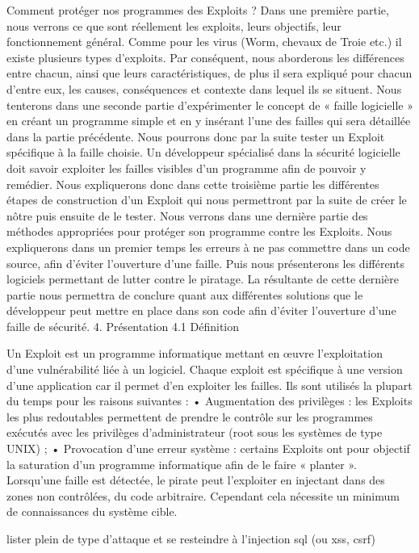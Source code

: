 \documentclass[a4paper,12pt]{report}
\begin{document}
\begin{onehalfspace}
Comment protéger nos programmes des Exploits ?
Dans une première partie, nous verrons ce que sont réellement les exploits, leurs objectifs, leur fonctionnement général. Comme pour les virus (Worm, chevaux de Troie etc.) il existe plusieurs types d’exploits. Par conséquent, nous aborderons les différences entre chacun, ainsi que leurs caractéristiques, de plus il sera expliqué pour chacun d’entre eux, les causes, conséquences et contexte dans lequel ils se situent.
Nous tenterons dans une seconde partie d’expérimenter le concept de « faille logicielle » en créant un programme simple et en y insérant l’une des failles qui sera détaillée dans la partie précédente. Nous pourrons donc par la suite tester un Exploit spécifique à la faille choisie.
Un développeur spécialisé dans la sécurité logicielle doit savoir exploiter les failles visibles d’un programme afin de pouvoir y remédier. Nous expliquerons donc dans cette troisième partie les différentes étapes de construction d’un Exploit  qui nous permettront par la suite de créer le nôtre puis ensuite de le tester.
Nous verrons dans une dernière partie des méthodes appropriées pour protéger son programme contre les Exploits. Nous expliquerons dans un premier temps les erreurs à ne pas commettre dans un code source, afin d’éviter l’ouverture d’une faille. Puis nous présenterons les différents logiciels permettant de lutter contre le piratage.
La résultante de cette dernière partie nous permettra de conclure quant aux différentes solutions que le développeur peut mettre en place dans son code afin d’éviter l’ouverture d’une faille de sécurité.
4.  Présentation
4.1 Définition

Un Exploit est un programme informatique mettant en œuvre l’exploitation  d'une vulnérabilité liée à un logiciel. Chaque exploit est spécifique à une version d'une application car il permet d'en exploiter les failles. Ils sont utilisés la plupart du temps pour les raisons suivantes :
• Augmentation des privilèges : les Exploits les plus redoutables permettent de prendre le contrôle sur les programmes exécutés avec les privilèges d'administrateur (root sous les systèmes de type UNIX) ;
• Provocation d'une erreur système : certains Exploits ont pour objectif la saturation d'un programme informatique afin de le faire « planter ».
Lorsqu’une faille est détectée, le pirate peut l’exploiter en injectant dans des zones non contrôlées, du code arbitraire. Cependant cela nécessite un minimum de connaissances du système cible.

lister plein de type d'attaque et se resteindre à l'injection sql (ou xss, csrf)


\end{onehalfspace}
\end{document}
